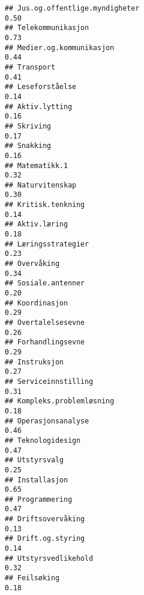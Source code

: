 \documentclass[
]{article}
\begin{document}
\begin{verbatim}
## Jus.og.offentlige.myndigheter                                                    0.50
## Telekommunikasjon                                                                0.73
## Medier.og.kommunikasjon                                                          0.44
## Transport                                                                        0.41
## Leseforståelse                                                                   0.14
## Aktiv.lytting                                                                    0.16
## Skriving                                                                         0.17
## Snakking                                                                         0.16
## Matematikk.1                                                                     0.32
## Naturvitenskap                                                                   0.30
## Kritisk.tenkning                                                                 0.14
## Aktiv.læring                                                                     0.18
## Læringsstrategier                                                                0.23
## Overvåking                                                                       0.34
## Sosiale.antenner                                                                 0.20
## Koordinasjon                                                                     0.29
## Overtalelsesevne                                                                 0.26
## Forhandlingsevne                                                                 0.29
## Instruksjon                                                                      0.27
## Serviceinnstilling                                                               0.31
## Kompleks.problemløsning                                                          0.18
## Operasjonsanalyse                                                                0.46
## Teknologidesign                                                                  0.47
## Utstyrsvalg                                                                      0.25
## Installasjon                                                                     0.65
## Programmering                                                                    0.47
## Driftsovervåking                                                                 0.13
## Drift.og.styring                                                                 0.14
## Utstyrsvedlikehold                                                               0.32
## Feilsøking                                                                       0.18

\end{verbatim}
\end{document}
